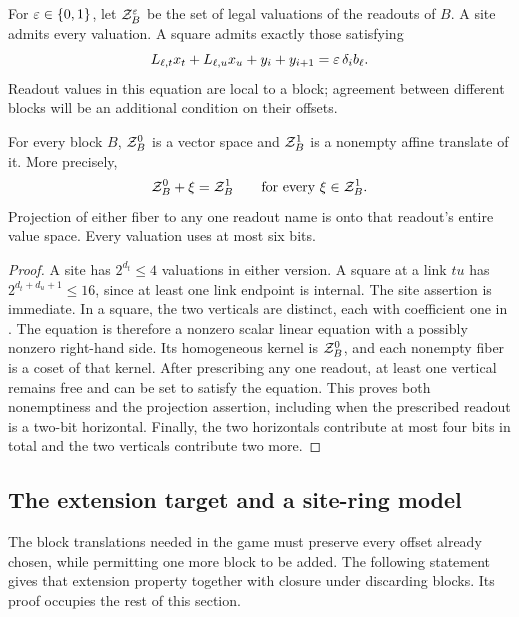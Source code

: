 For \(\varepsilon\in\{0,1\}\), let \(\mathcal Z_B^\varepsilon\) be the set of legal valuations
of the readouts of \(B\). A site admits every valuation. A square admits
exactly those satisfying
\begin{equation}
 L_{\ell,t}x_t+L_{\ell,u}x_u+y_i+y_{i+1}
       =\varepsilon\,\delta_i b_\ell.
 \label{eq:square-equation}
\end{equation}
Readout values in this equation are local to a block; agreement between
different blocks will be an additional condition on their offsets.

\begin{lemma}
\label{lem:block-fibers}
For every block \(B\), \(\mathcal Z_B^0\) is a vector space and \(\mathcal Z_B^1\)
is a nonempty affine translate of it. More precisely,
\[
 \mathcal Z_B^0+\xi=\mathcal Z_B^1\qquad\text{for every }\xi\in\mathcal Z_B^1.
\]
Projection of either fiber to any one readout name is onto that
readout's entire value space. Every valuation uses at most six bits.
\end{lemma}

\begin{proof}
A site has \(2^{d_t}\le4\) valuations in either version.
A square at a link \(tu\) has \(2^{d_t+d_u+1}\le16\), since at least
one link endpoint is internal. The site assertion is immediate. In a square, the two verticals are
distinct, each with coefficient one in .
The equation is therefore a nonzero scalar linear equation with a
possibly nonzero right-hand side. Its homogeneous kernel is
\(\mathcal Z_B^0\), and each nonempty fiber is a coset of that kernel.
After prescribing any one readout, at least one vertical remains free
and can be set to satisfy the equation. This proves both nonemptiness
and the projection assertion, including when the prescribed readout is
a two-bit horizontal. Finally, the two horizontals contribute at most
four bits in total and the two verticals contribute two more.
\end{proof}



\subsection{The extension target and a site-ring model}

The block translations needed in the game must preserve every offset
already chosen, while permitting one more block to be added. The following
statement gives that extension property together with closure under
discarding blocks. Its proof occupies the rest of this section.

